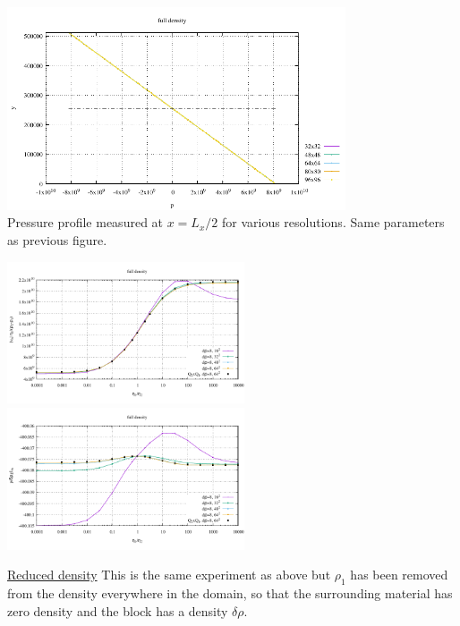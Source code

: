 \begin{center}
\includegraphics[width=10cm]{python_codes/fieldstone_72/results/block/full/plines}\\
{\captionfont Pressure profile measured at $x=L_x/2$ for various resolutions. Same parameters
as previous figure.}
\end{center}

\includegraphics[width=7cm]{python_codes/fieldstone_72/results/block/full/results_v}
\includegraphics[width=7cm]{python_codes/fieldstone_72/results/block/full/results_p}

\underline{Reduced density} 
This is the same experiment as above but $\rho_1$ has been removed from the density
everywhere in the domain, so that the surrounding material has zero density 
and the block has a density $\delta \rho$.


